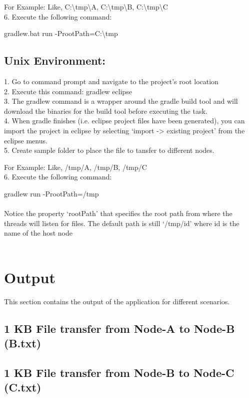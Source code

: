 \documentclass{scrartcl}
\begin{document}
For Example: Like, {C:\textbackslash tmp\textbackslash A}, {C:\textbackslash tmp\textbackslash B}, {C:\textbackslash tmp\textbackslash C}  \\
6. Execute the following command: 

gradlew.bat run -ProotPath=C:\textbackslash tmp
\subsection{Unix Environment:}
1. Go to command prompt and navigate to the project's root location \\ 
2. Execute this command: {gradlew eclipse} \\
3. The gradlew command is a wrapper around the gradle build tool and will download the binaries for the build tool before executing the task. \\
4. When gradle finishes (i.e. eclipse project files have been generated), you can import the project in eclipse by selecting ‘import -> existing project’ from the eclipse menus. \\
5. Create sample folder to place the file to tansfer to different nodes.

For Example: Like, /tmp/A,  /tmp/B,  /tmp/C \\
6. Execute the following command: 

gradlew run -ProotPath=/tmp \\ \\
Notice the property ‘rootPath’ that specifies the root path from where the threads will listen for files. The default path is still ‘/tmp/{id}’ where id is the name of the host node \\ \\

\section{Output}
This section contains the output of the application for different scenarios. \\

\subsection{1 KB File transfer from Node-A to Node-B (B.txt)}

\subsection{1 KB File transfer from Node-B to Node-C (C.txt)}

\end{document}
